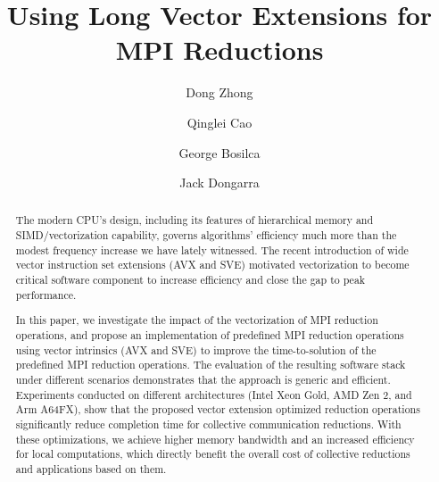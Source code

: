 \documentclass[5p,times,twocolumn]{elsarticle}
\begin{document}
\title{Using Long Vector Extensions for MPI Reductions}

\author[First]{Dong Zhong}

\author[First]{Qinglei Cao}

\author[First]{George Bosilca}

\author[First]{Jack Dongarra}

\address[First]{The University of Tennessee, 1122 Volunteer Blvd, knoxville, TN 37996}

\begin{abstract}
  The modern CPU's design, including its features of hierarchical memory and
  SIMD/vectorization capability, governs algorithms' efficiency much more than
  the modest frequency increase we have lately witnessed. The recent
  introduction of wide vector instruction set extensions (AVX and SVE) motivated
  vectorization to become critical software component to increase efficiency and
  close the gap to peak performance.

  In this paper, we investigate the impact of the vectorization of MPI reduction
  operations, and propose an implementation of predefined MPI reduction
  operations using vector intrinsics (AVX and SVE) to improve the
  time-to-solution of the predefined MPI reduction operations.
  The evaluation of the resulting software stack under different scenarios
  demonstrates that the approach is generic and efficient.  Experiments
  conducted on different architectures (Intel Xeon Gold, AMD Zen 2, and Arm
  A64FX), show that the proposed vector extension optimized reduction operations
  significantly reduce completion time for collective communication reductions.
  With these optimizations, we achieve higher memory bandwidth and an increased
  efficiency for local computations, which directly benefit the overall cost of
  collective reductions and applications based on them.


\end{abstract}
\end{document}
